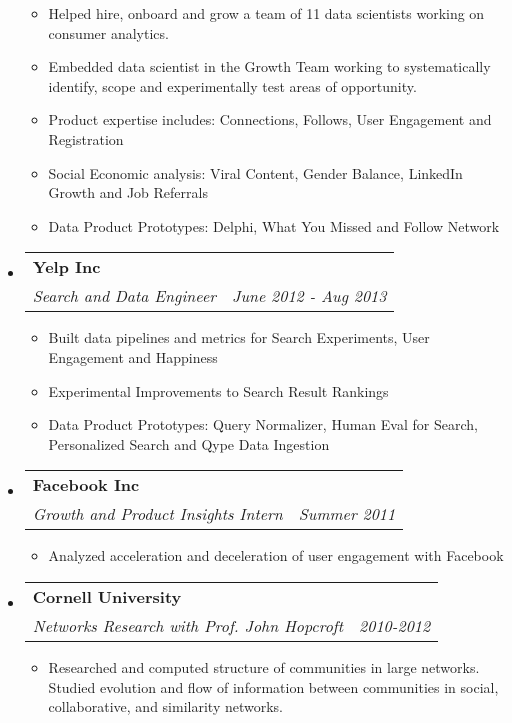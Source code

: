 \documentclass[letterpaper,11pt]{article}
\makeatletter
\newcommand{\resitem}[1]{\item #1 \vspace{-2pt}}
\newcommand{\ressubheading}[4]{

\begin{tabular*}{6.5in}{l@{\cftdotfill{\cftsecdotsep}\extracolsep{\fill}}r}

		\textbf{#1} & #2 \\

		\textit{#3} & \textit{#4} \\

\end{tabular*}\vspace{-6pt}}
\makeatother
\begin{document}
\begin{itemize}
	\begin{itemize}
	
		\resitem{Helped hire, onboard and grow a team of 11 data scientists working on consumer analytics.}
		
		\resitem{Embedded data scientist in the Growth Team working to systematically identify, scope and experimentally test areas of opportunity.}

		\resitem{Product expertise includes: Connections, Follows, User Engagement and Registration}

		\resitem{Social Economic analysis: Viral Content, Gender Balance, LinkedIn Growth and Job Referrals}
		
		\resitem{Data Product Prototypes: Delphi, What You Missed and Follow Network}
		
	\end{itemize}

\item 
	\ressubheading{\color{yelpcolor}Yelp Inc}{}{Search and Data Engineer}{June 2012 - Aug 2013}

	\begin{itemize}
		\resitem{Built data pipelines and metrics for Search Experiments, User Engagement and Happiness}

		\resitem{Experimental Improvements to Search Result Rankings}

		\resitem{Data Product Prototypes: Query Normalizer, Human Eval for Search, Personalized Search and Qype Data Ingestion}

	\end{itemize}


\item

	\ressubheading{\color{facebookcolor}Facebook Inc}{}{Growth and Product Insights Intern}{Summer 2011}

	\begin{itemize}

		\resitem{Analyzed acceleration and deceleration of user engagement with Facebook}

	\end{itemize}


\item
	\ressubheading{\color{darkred}Cornell University}{}{Networks Research with Prof. John Hopcroft }{2010-2012}

	\begin{itemize}

		\resitem{Researched and computed structure of communities in large networks. Studied evolution and flow of information between communities in social, collaborative, and similarity networks.}


\end{itemize}
\end{itemize}
\end{document}
